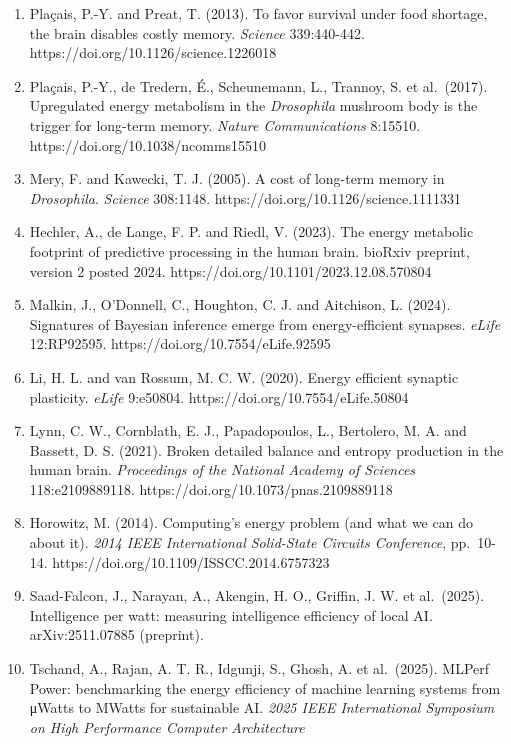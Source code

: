 \documentclass[
  10pt,
]{article}
\begin{document}
\begin{enumerate}
  https://doi.org/10.1016/j.neuron.2021.10.024
\item
  Plaçais, P.-Y. and Preat, T. (2013). To favor survival under food
  shortage, the brain disables costly memory. \emph{Science}
  339:440-442. https://doi.org/10.1126/science.1226018
\item
  Plaçais, P.-Y., de Tredern, É., Scheunemann, L., Trannoy, S. et
  al.~(2017). Upregulated energy metabolism in the \emph{Drosophila}
  mushroom body is the trigger for long-term memory. \emph{Nature
  Communications} 8:15510. https://doi.org/10.1038/ncomms15510
\item
  Mery, F. and Kawecki, T. J. (2005). A cost of long-term memory in
  \emph{Drosophila}. \emph{Science} 308:1148.
  https://doi.org/10.1126/science.1111331
\item
  Hechler, A., de Lange, F. P. and Riedl, V. (2023). The energy
  metabolic footprint of predictive processing in the human brain.
  bioRxiv preprint, version 2 posted 2024.
  https://doi.org/10.1101/2023.12.08.570804
\item
  Malkin, J., O'Donnell, C., Houghton, C. J. and Aitchison, L. (2024).
  Signatures of Bayesian inference emerge from energy-efficient
  synapses. \emph{eLife} 12:RP92595. https://doi.org/10.7554/eLife.92595
\item
  Li, H. L. and van Rossum, M. C. W. (2020). Energy efficient synaptic
  plasticity. \emph{eLife} 9:e50804. https://doi.org/10.7554/eLife.50804
\item
  Lynn, C. W., Cornblath, E. J., Papadopoulos, L., Bertolero, M. A. and
  Bassett, D. S. (2021). Broken detailed balance and entropy production
  in the human brain. \emph{Proceedings of the National Academy of
  Sciences} 118:e2109889118. https://doi.org/10.1073/pnas.2109889118
\item
  Horowitz, M. (2014). Computing's energy problem (and what we can do
  about it). \emph{2014 IEEE International Solid-State Circuits
  Conference}, pp.~10-14. https://doi.org/10.1109/ISSCC.2014.6757323
\item
  Saad-Falcon, J., Narayan, A., Akengin, H. O., Griffin, J. W. et
  al.~(2025). Intelligence per watt: measuring intelligence efficiency
  of local AI. arXiv:2511.07885 (preprint).
\item
  Tschand, A., Rajan, A. T. R., Idgunji, S., Ghosh, A. et al.~(2025).
  MLPerf Power: benchmarking the energy efficiency of machine learning
  systems from μWatts to MWatts for sustainable AI. \emph{2025 IEEE
  International Symposium on High Performance Computer Architecture
}
\end{enumerate}
\end{document}
